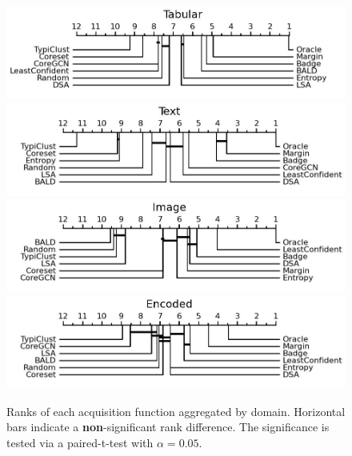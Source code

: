 \documentclass[]{article}
\begin{document}
%
\begin{figure}
    \centering
    \caption{Ranks of each acquisition function aggregated by domain. Horizontal bars indicate a \textbf{non}-significant rank difference. The significance is tested via a paired-t-test with $\alpha=0.05$.}
    \label{fig:ranks_by_domain}
    \includegraphics[width=0.49\linewidth]{img/macro_vector.jpg}
    \includegraphics[width=0.49\linewidth]{img/macro_text.jpg}
    \includegraphics[width=0.49\linewidth]{img/macro_img.jpg}
    \includegraphics[width=0.49\linewidth]{img/macro_enc.jpg}
\end{figure}
%
\end{document}
